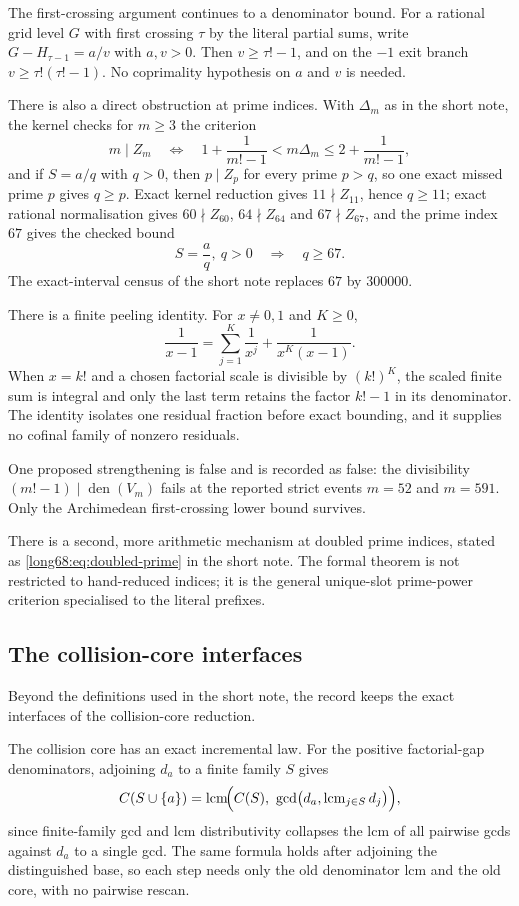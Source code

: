 \documentclass[11pt]{article}
\newcommand{\Ser}{S}
\newcommand{\den}{\operatorname{den}}
\begin{document}
The first-crossing argument continues to a denominator bound.  For a rational
grid level $G$ with first crossing $\tau$ by the literal partial sums, write
$G-H_{\tau-1}=a/v$ with $a,v>0$.  Then $v\ge\tau!-1$, and on the $-1$ exit
branch $v\ge\tau!(\tau!-1)$.  No coprimality hypothesis on $a$ and $v$ is
needed.

There is also a direct obstruction at prime indices.  With $\Delta_m$ as in
the short note, the kernel checks for $m\ge3$ the criterion
\[
 m\mid Z_m
 \quad\Longleftrightarrow\quad
 1+\frac1{m!-1}<m\Delta_m\le2+\frac1{m!-1},
\]
and if $\Ser=a/q$ with $q>0$, then $p\mid Z_p$ for every prime $p>q$, so one
exact missed prime $p$ gives $q\ge p$.  Exact kernel reduction gives
$11\nmid Z_{11}$, hence $q\ge11$; exact rational normalisation gives
$60\nmid Z_{60}$, $64\nmid Z_{64}$ and $67\nmid Z_{67}$, and the prime index
$67$ gives the checked bound
\[
 \Ser=\frac aq,\ q>0\quad\Longrightarrow\quad q\ge67 .
\]
The exact-interval census of the short note replaces $67$ by $300000$.

There is a finite peeling identity.  For $x\ne0,1$ and $K\ge0$,
\[
 \frac1{x-1}=\sum_{j=1}^{K}\frac1{x^j}+\frac1{x^K(x-1)} .
\]
When $x=k!$ and a chosen factorial scale is divisible by $(k!)^K$, the scaled
finite sum is integral and only the last term retains the factor $k!-1$ in
its denominator.  The identity isolates one residual fraction before exact
bounding, and it supplies no cofinal family of nonzero residuals.

One proposed strengthening is false and is recorded as false: the
divisibility $(m!-1)\mid\den(V_m)$ fails at the reported strict events
$m=52$ and $m=591$.  Only the Archimedean first-crossing lower bound
survives.

There is a second, more arithmetic mechanism at doubled prime indices, stated
as \eqref{long68:eq:doubled-prime} in the short note.  The formal theorem is not
restricted to hand-reduced indices; it is the general unique-slot prime-power
criterion specialised to the literal prefixes.

\subsection{The collision-core interfaces}\label{long68:sec:ext-collision}

Beyond the definitions used in the short note, the record keeps the exact
interfaces of the collision-core reduction.

The collision core has an exact incremental law.  For the positive
factorial-gap denominators, adjoining $d_a$ to a finite family $S$ gives
\[
 C(S\cup\{a\})=\lcm\!\Bigl(C(S),\ \gcd\bigl(d_a,\lcm_{j\in S}d_j\bigr)\Bigr),
\]
since finite-family gcd and lcm distributivity collapses the lcm of all
pairwise gcds against $d_a$ to a single gcd.  The same formula holds after
adjoining the distinguished base, so each step needs only the old denominator
lcm and the old core, with no pairwise rescan.
\end{document}
